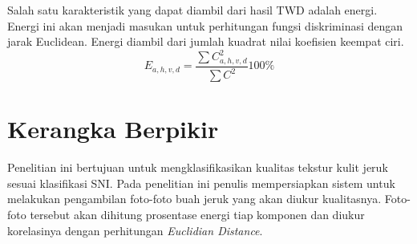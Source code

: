 \documentclass[laporan.tex]{subfiles}
\begin{document}
Salah satu karakteristik yang dapat diambil dari hasil TWD adalah energi. Energi ini akan menjadi masukan untuk perhitungan fungsi diskriminasi dengan jarak Euclidean.
Energi diambil dari jumlah kuadrat nilai koefisien keempat ciri.
\begin{equation}
E_{a,h,v,d}=\frac{\sum C^2_{a,h,v,d}}{\sum C^2} 100\%
\end{equation}
\section{Kerangka Berpikir}

Penelitian ini bertujuan untuk mengklasifikasikan kualitas tekstur kulit jeruk sesuai klasifikasi SNI. Pada penelitian ini penulis mempersiapkan sistem untuk melakukan pengambilan foto-foto buah jeruk yang akan diukur kualitasnya. Foto-foto tersebut akan dihitung prosentase energi tiap komponen dan diukur korelasinya dengan perhitungan \emph{Euclidian Distance}.
\end{document}

